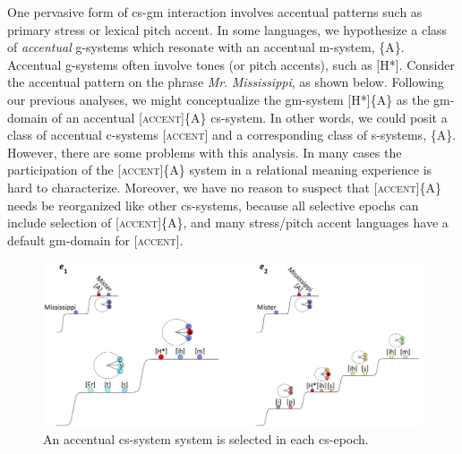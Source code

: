 One pervasive form of cs-gm interaction involves accentual patterns such as primary stress or lexical pitch accent. In some languages, we hypothesize a class of \textit{accentual} g-systems which resonate with an accentual m-system, \{A\}. Accentual g-systems often involve tones (or pitch accents), such as [H*]. Consider the accentual pattern on the phrase \textit{Mr}. \textit{Mississippi}, as shown below. Following our previous analyses, we might conceptualize the gm-system [H*]\{A\} as the gm-domain of an accentual [\textsc{accent}]\{A\} cs-system. In other words, we could posit a class of accentual c-systems [\textsc{accent}] and a corresponding class of s-systems, \{A\}. However, there are some problems with this analysis. In many cases the participation of the [\textsc{accent}]\{A\} system in a relational meaning experience is hard to characterize. Moreover, we have no reason to suspect that [\textsc{accent}]\{A\} needs be reorganized like other cs-systems, because all selective epochs can include selection of [\textsc{accent}]\{A\}, and many stress/pitch accent languages have a default gm-domain for [\textsc{accent}].

  
\begin{figure}
\includegraphics[width=\textwidth]{figures/Tilsen-img63.png}
\caption{An accentual cs-system system is selected in each cs-epoch.}
\label{fig:4:13}
\end{figure}
 

